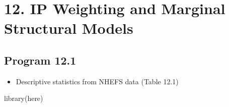 \documentclass[
  10pt,
  a4paper,
]{book}
\newenvironment{Shaded}{\begin{snugshade}}{\end{snugshade}}
\newcommand{\FunctionTok}[1]{\textcolor[rgb]{0.28,0.35,0.67}{#1}}
\newcommand{\NormalTok}[1]{\textcolor[rgb]{0.00,0.46,0.62}{#1}}
\providecommand{\tightlist}{%
  \setlength{\itemsep}{0pt}\setlength{\parskip}{0pt}}
\begin{document}
\chapter*{12. IP Weighting and Marginal Structural Models}\label{ip-weighting-and-marginal-structural-models}

\section{Program 12.1}\label{program-12.1}

\begin{itemize}
\tightlist
\item
  Descriptive statistics from NHEFS data (Table 12.1)
\end{itemize}

\begin{Shaded}
\begin{Highlighting}[]
\FunctionTok{library}\NormalTok{(here)}
\end{Highlighting}
\end{Shaded}
\end{document}
